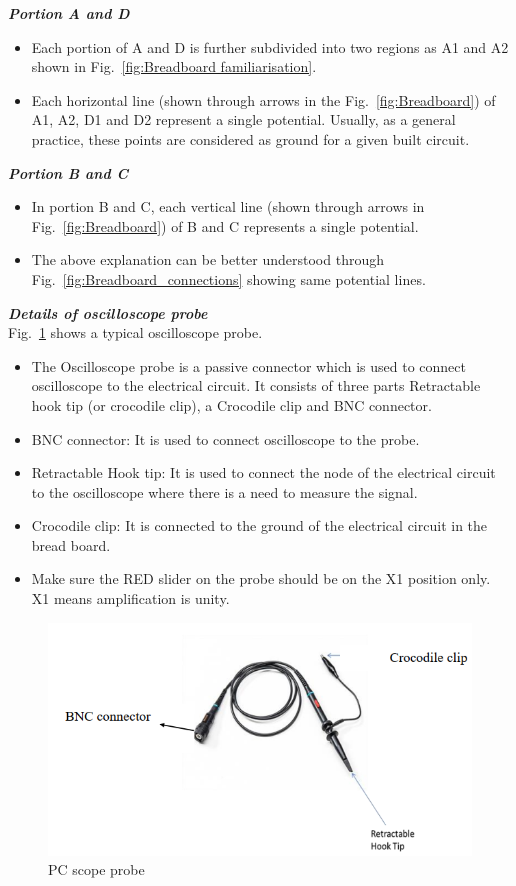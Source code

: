 \documentclass[9pt]{scrreprt}
\begin{document}
\textbf{\textit{Portion A and D}}
\begin{itemize}
\item Each portion of A and D is further subdivided into two regions as A1 and A2 shown in Fig.~\ref{fig:Breadboard familiarisation}.
\item Each horizontal line (shown through arrows in the Fig.~\ref{fig:Breadboard}) of A1, A2, D1 and D2 represent a single potential. Usually, as a general practice, these points are considered as ground for a given built circuit.
\end{itemize}

\textbf{\textit{Portion B and C}}
\begin{itemize}
\item In portion B and C, each vertical line (shown through arrows in Fig.~\ref{fig:Breadboard}) of B and C represents a single potential.
\item The above explanation can be better understood through Fig.~\ref{fig:Breadboard_connections} showing same potential lines.
\end{itemize}

\textbf{\textit{Details of oscilloscope probe}}\\

Fig.~\ref{fig:Oscilloscope_probe} shows a typical oscilloscope probe.

\begin{itemize}
\item The Oscilloscope probe is a passive connector which is used to connect oscilloscope to the electrical circuit. It consists of three parts Retractable hook tip (or crocodile clip), a Crocodile clip and BNC connector.
\item BNC connector: It is used to connect oscilloscope to the probe.
\item Retractable Hook tip: It is used to connect the node of the electrical circuit to the oscilloscope where there is a need to measure the signal.
\item Crocodile clip: It is connected to the ground of the electrical circuit in the bread board.
\item Make sure the RED slider on the probe should be on the X1 position only. X1 means amplification is unity.
\end{itemize}


\begin{figure}[H]
	\centering
	\includegraphics[width=0.8\linewidth]{logos/Oscilloscope_probe.png}
	\caption{PC scope probe}
	\label{fig:Oscilloscope_probe}
\end{figure}
\end{document}
